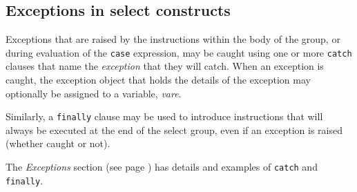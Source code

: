 \subsection{Exceptions in select constructs}
 
Exceptions that are raised by the instructions within the body of the
group, or during evaluation of the \texttt{case} expression, may be
caught using one or more \texttt{catch} clauses that name
the \emph{exception} that they will catch.
When an exception is caught, the exception object that holds the details
of the exception may optionally be assigned to a variable,
\emph{vare}.
 
Similarly, a \texttt{finally} clause may be used to introduce
instructions that will always be executed at the end of the select
group, even if an exception is raised (whether caught or not).
 
The  \emph{Exceptions} section (see page \pageref{refexcep})  has details and
examples of \texttt{catch} and \texttt{finally}.
\index{,}
